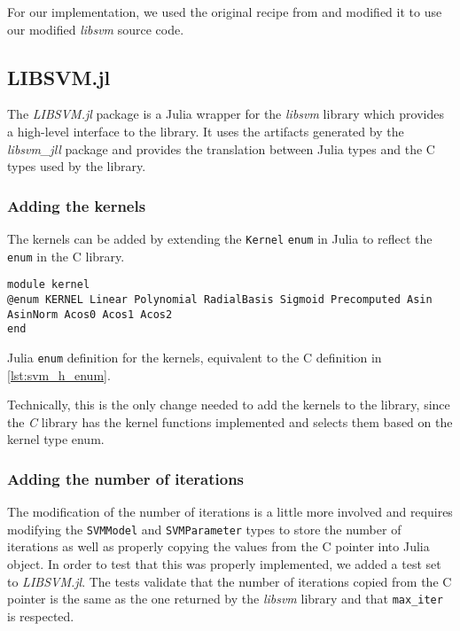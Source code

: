 For our implementation, we used the original recipe from \textcite{LibsvmJllJl2022} and modified it
to use our modified \emph{libsvm} source code.

\subsection{LIBSVM.jl}

The \emph{LIBSVM.jl} package \cite{LIBSVMJl2023} is a Julia wrapper for the \emph{libsvm} library which
provides a high-level interface to the library. It uses the artifacts generated by the \emph{libsvm\_jll}
package and provides the translation between Julia types and the C types used by the library.

\subsubsection{Adding the kernels}

The kernels can be added by extending the \texttt{Kernel} \texttt{enum} in Julia to reflect the
\texttt{enum} in the C library.
\begin{listing}[H]
\begin{verbatim}
module kernel
@enum KERNEL Linear Polynomial RadialBasis Sigmoid Precomputed Asin AsinNorm Acos0 Acos1 Acos2
end
\end{verbatim}
\caption{Julia \texttt{enum} definition for the kernels, equivalent to the C definition in \cref{lst:svm_h_enum}.}
\label{lst:kernel_enum_julia}
\end{listing}

Technically, this is the only change needed to add the kernels to the library, since the
\emph{C} library has the kernel functions implemented and selects them based on the kernel type enum.

\subsubsection{Adding the number of iterations}

The modification of the number of iterations is a little more involved and requires modifying the
\texttt{SVMModel} and \texttt{SVMParameter} types to store the number of iterations as well
as properly copying the values from the C pointer into Julia object. In order to test that
this was properly implemented, we added a test set to \emph{LIBSVM.jl}. The tests
validate that the number of iterations copied from the C pointer is the same as the one
returned by the \emph{libsvm} library and that \texttt{max\_iter} is respected.

